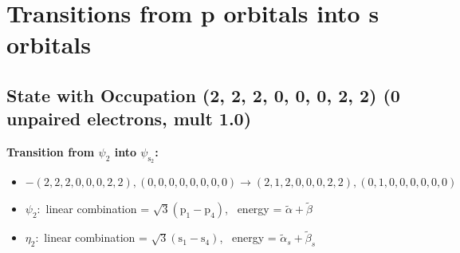 \documentclass[12pt,a4paper]{article}
\begin{document}
\newpage \section*{Transitions from p orbitals into s orbitals}\subsection*{State with Occupation (2, 2, 2, 0, 0, 0, 2, 2) (0 unpaired electrons, mult 1.0)}
        \noindent\textbf{Transition from $\psi_{2}$ into $\psi_{\text{s}_{2}}$:}
        \begin{itemize}
            \item $- (2, 2, 2, 0, 0, 0, 2, 2), (0, 0, 0, 0, 0, 0, 0, 0) \rightarrow (2, 1, 2, 0, 0, 0, 2, 2), (0, 1, 0, 0, 0, 0, 0, 0)$
        
            \item $\psi_{2}:$ linear combination = $\sqrt{3} \left(\text{p}_{1} - \text{p}_{4}\right)$, \
            energy = $\tilde{\alpha} + \tilde{\beta}$
            
            \item $\eta_{2}:$ linear combination = $\sqrt{3} \left(\text{s}_{1} - \text{s}_{4}\right)$, \
            energy = $\tilde{\alpha}_{s} + \tilde{\beta}_{s}$
            

\end{itemize}
\end{document}
